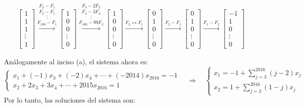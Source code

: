 \documentclass[12pt,reqno]{amsart}
\begin{document}
\begin{enumerate}
\begin{enumerate}
\begin{align*}
&\left[\begin{array}{c} 1\\ 1 \\ 1 \\ \vdots \\1 \end{array}\right]
\stackrel{F_2-F_1}{\stackrel{F_3 - F_1}{\stackrel{\vdots}{\stackrel{F_{100}-F_1}{\longrightarrow}}}}
\left[\begin{array}{c} 1\\ 0 \\ 0 \\ \vdots \\0 \end{array}\right]
\stackrel{F_3-2F_2}{\stackrel{F_4-3F_2}{\stackrel{\vdots}{\stackrel{F_{100}-99F_2}{\longrightarrow}}}}
\left[\begin{array}{c} 1\\ 0 \\ 0 \\ \vdots \\0 \end{array}\right]
\stackrel{F_2 \leftrightarrow F_1}{\longrightarrow}
\left[\begin{array}{c} 0\\ 1 \\ 0 \\ \vdots \\0 \end{array}\right]
\stackrel{F_2-F_1}{\longrightarrow}
\left[\begin{array}{c} 0\\ 1 \\ 0 \\ \vdots \\0 \end{array}\right]
\stackrel{F_1-F_2}{\longrightarrow} 
\left[\begin{array}{c} -1\\ 1 \\ 0 \\ \vdots \\0 \end{array}\right]
\end{align*}

Análogamente al inciso (a), el sistema ahora es:
\begin{equation*}
\begin{cases}
x_1 + (-1)x_3 + (-2)x_4 + \cdots + (-2014)x_{2016} = -1\\
x_2 + 2 x_3 + 3 x_4 + \cdots + 2015 x_{2016} = 1
\end{cases}
\quad \Rightarrow \quad
\begin{cases}
x_1 = -1 + \sum_{j=3}^{2016} (j-2) x_j \\
x_2 = 1 + \sum_{j=3}^{2016} (1-j) x_j
\end{cases}
\end{equation*}
Por lo tanto,  las soluciones del sistema son:


\end{enumerate}
\end{enumerate}
\end{document}
